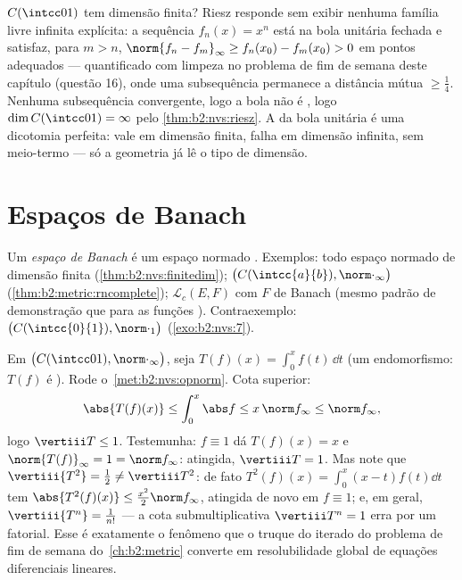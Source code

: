 \begin{example}\label{ex:b2:nvs:rieszdetector}
$C(\intcc01)$ tem dimensão finita? Riesz responde sem
exibir nenhuma família livre infinita explícita: a sequência
$f_n(x) = x^n$ está na bola unitária fechada e satisfaz, para
$m > n$, $\norm{f_n - f_m}_\infty \geq f_n(x_0) - f_m(x_0) > 0$
em pontos adequados --- quantificado com limpeza no problema de fim de semana
deste capítulo (questão 16), onde uma subsequência permanece a
distância mútua $\geq \frac14$. Nenhuma subsequência convergente, logo
a bola não é , logo $\dim C(\intcc01) = \infty$ pelo
\cref{thm:b2:nvs:riesz}. A  da bola unitária é uma
dicotomia perfeita: vale em dimensão finita, falha em dimensão
infinita, sem meio-termo --- só a geometria já
lê o tipo de dimensão.
\end{example}

\section{Espaços de Banach}

\begin{definition}\label{def:b2:nvs:banach}
Um \emph{espaço de Banach} é um espaço normado
. Exemplos: todo espaço normado de dimensão finita
(\cref{thm:b2:nvs:finitedim}); $\bigl(C(\intcc{a}{b}),
\norm\cdot_\infty\bigr)$ (\cref{thm:b2:metric:rncomplete});
$\mathcal{L}_c(E, F)$ com $F$ de Banach (mesmo padrão de demonstração que para as
funções ). Contraexemplo: $\bigl(C(\intcc{0}{1}),
\norm\cdot_1\bigr)$ (\cref{exo:b2:nvs:7}).
\end{definition}

\begin{example}\label{ex:b2:nvs:integrationnorm}
Em $\bigl(C(\intcc01), \norm\cdot_\infty\bigr)$, seja $T(f)(x) =
\int_0^x f(t)\,\dd t$ (um endomorfismo: $T(f)$ é ).
Rode o~\cref{met:b2:nvs:opnorm}. Cota superior:
\[
\abs{T(f)(x)} \leq \int_0^x\abs f \leq x\,\norm f_\infty \leq
\norm f_\infty ,
\]
logo $\vertiii T \leq 1$. Testemunha: $f \equiv 1$ dá $T(f)(x) =
x$ e $\norm{T(f)}_\infty = 1 = \norm f_\infty$: atingida,
$\vertiii T = 1$. Mas note que $\vertiii{T^2} = \frac12 \neq
\vertiii T^2$: de fato $T^2(f)(x) = \int_0^x(x - t)f(t)\dd t$ tem
$\abs{T^2(f)(x)} \leq \frac{x^2}2\norm f_\infty$, atingida de novo
em $f \equiv 1$; e, em geral, $\vertiii{T^n} = \frac1{n!}$ ---
a cota submultiplicativa $\vertiii T^n = 1$ erra por um
fatorial. Esse é exatamente o fenômeno que o truque do iterado do
problema de fim de semana do~\cref{ch:b2:metric} converte em
resolubilidade global de equações diferenciais lineares.
\end{example}

